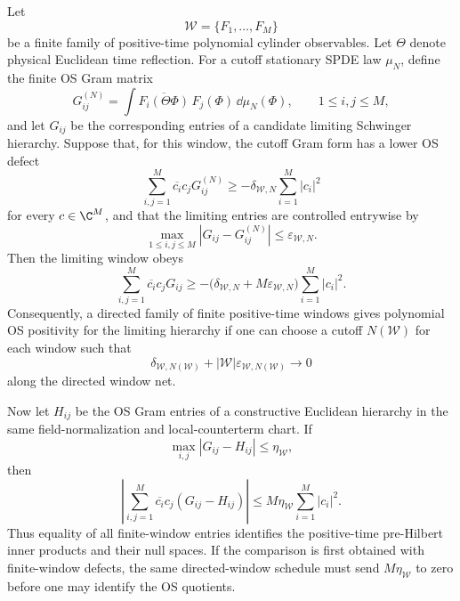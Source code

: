 \begin{proposition}
\label{prop:spde-finite-window-os-assembly-defect-budget}
Let
\[
  \mathcal W=\{F_1,\ldots,F_M\}
\]
be a finite family of positive-time polynomial cylinder observables.  Let
\(\Theta\) denote physical Euclidean time reflection.  For a cutoff
stationary SPDE law \(\mu_N\), define the finite OS Gram matrix
\[
  G_{ij}^{(N)}
  =
  \int
    \overline{F_i(\Theta\Phi)}\,F_j(\Phi)\,
    \dd\mu_N(\Phi),
  \qquad 1\leq i,j\leq M,
\]
and let \(G_{ij}\) be the corresponding entries of a candidate limiting
Schwinger hierarchy.  Suppose that, for this window, the cutoff Gram form has
a lower OS defect
\begin{equation}
  \sum_{i,j=1}^M \overline{c_i}c_jG_{ij}^{(N)}
  \geq
  -\delta_{\mathcal W,N}\sum_{i=1}^M |c_i|^2
  \label{eq:spde-finite-window-cutoff-os-defect}
\end{equation}
for every \(c\in\C^M\), and that the limiting entries are controlled
entrywise by
\begin{equation}
  \max_{1\leq i,j\leq M}|G_{ij}-G_{ij}^{(N)}|
  \leq
  \varepsilon_{\mathcal W,N}.
  \label{eq:spde-finite-window-entrywise-defect}
\end{equation}
Then the limiting window obeys
\begin{equation}
  \sum_{i,j=1}^M \overline{c_i}c_jG_{ij}
  \geq
  -\bigl(\delta_{\mathcal W,N}
       +M\varepsilon_{\mathcal W,N}\bigr)
  \sum_{i=1}^M|c_i|^2 .
  \label{eq:spde-finite-window-limit-os-defect}
\end{equation}
Consequently, a directed family of finite positive-time windows gives
polynomial OS positivity for the limiting hierarchy if one can choose a
cutoff \(N(\mathcal W)\) for each window such that
\[
  \delta_{\mathcal W,N(\mathcal W)}
  +|\mathcal W|\varepsilon_{\mathcal W,N(\mathcal W)}
  \longrightarrow0
\]
along the directed window net.

Now let \(H_{ij}\) be the OS Gram entries of a constructive Euclidean
hierarchy in the same field-normalization and local-counterterm chart.  If
\[
  \max_{i,j}|G_{ij}-H_{ij}|\leq\eta_{\mathcal W},
\]
then
\begin{equation}
  \left|
  \sum_{i,j=1}^M\overline{c_i}c_j(G_{ij}-H_{ij})
  \right|
  \leq
  M\eta_{\mathcal W}\sum_{i=1}^M|c_i|^2 .
  \label{eq:spde-finite-window-constructive-comparison-defect}
\end{equation}
Thus equality of all finite-window entries identifies the positive-time
pre-Hilbert inner products and their null spaces.  If the comparison is
first obtained with finite-window defects, the same directed-window schedule
must send \(M\eta_{\mathcal W}\) to zero before one may identify the OS
quotients.


\end{proposition}
